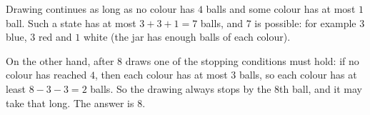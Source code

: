 Drawing continues as long as no colour has $4$ balls and some colour has at most $1$ ball. Such a state has at most $3+3+1=7$ balls, and $7$ is possible: for example $3$ blue, $3$ red and $1$ white (the jar has enough balls of each colour).

On the other hand, after $8$ draws one of the stopping conditions must hold: if no colour has reached $4$, then each colour has at most $3$ balls, so each colour has at least $8-3-3=2$ balls. So the drawing always stops by the $8$th ball, and it may take that long. The answer is $\boxed{8}$.
